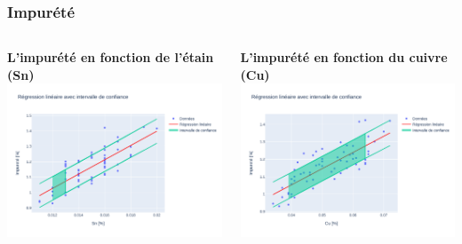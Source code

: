 \documentclass[aspectratio=169]{beamer}
\begin{document}
\begin{frame}
\frametitle{Impurété}
\begin{columns}[t]
  \begin{column}{0.5\textwidth}
    \centering
    \textbf{L'impurété en fonction de l'étain (Sn)} \\
    \includegraphics[width=\textwidth]{Figures/Regression_Impurete_Sn.pdf} 
  \end{column}
  \begin{column}{0.5\textwidth}
    \centering
    \textbf{L'impurété en fonction du cuivre (Cu)} \\
    \includegraphics[width=\textwidth]{Figures/Regression_Impurete_Cu.pdf} 
  \end{column}
\end{columns}
\end{frame}
\end{document}
